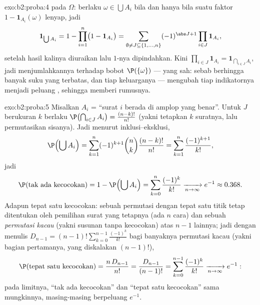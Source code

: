 \begin{solution}{exo:b2:proba:4}
 pada $\Omega$: berlaku $\omega \in \bigcup A_i$ bila dan hanya bila suatu faktor
$1 - \mathbf{1}_{A_i}(\omega)$ lenyap, jadi
\[
\mathbf{1}_{\bigcup A_i}
= 1 - \prod_{i=1}^n\bigl(1 - \mathbf{1}_{A_i}\bigr)
= \sum_{\emptyset \neq J \subseteq \{1,\dots,n\}}
(-1)^{\abs J + 1}\prod_{i \in J}\mathbf{1}_{A_i} ,
\]
setelah hasil kalinya diuraikan lalu $1$-nya dipindahkan. Kini
$\prod_{i\in J}\mathbf{1}_{A_i} = \mathbf{1}_{\bigcap_{i \in J}
A_i}$, jadi menjumlahkannya terhadap bobot $\P(\{\omega\})$ ---
yang sah: sebab berhingga banyak suku yang terbatas, dan tiap keluarganya  ---
mengubah tiap indikatornya menjadi peluang , sehingga memberi
rumusnya.
\end{solution}

\begin{solution}{exo:b2:proba:5}
Misalkan $A_i$ = ``surat $i$ berada di amplop yang benar''. Untuk $J$
berukuran $k$ berlaku $\P\bigl(\bigcap_{i\in J}A_i\bigr) =
\frac{(n-k)!}{n!}$ (yakni tetapkan $k$ suratnya, lalu permutasikan sisanya). Jadi menurut
inklusi--eksklusi,
\[
\P\Bigl(\bigcup A_i\Bigr)
= \sum_{k=1}^n (-1)^{k+1}\binom nk \frac{(n-k)!}{n!}
= \sum_{k=1}^n \frac{(-1)^{k+1}}{k!} ,
\]
jadi
\[
\P(\text{tak ada kecocokan})
= 1 - \P\Bigl(\bigcup A_i\Bigr)
= \sum_{k=0}^{n}\frac{(-1)^k}{k!}
\xrightarrow[n\to\infty]{} e^{-1} \approx 0.368 .
\]
Adapun tepat satu kecocokan: sebuah permutasi dengan tepat satu titik tetap
ditentukan oleh pemilihan surat yang tetapnya (ada $n$ cara) dan sebuah
\emph{permutasi kacau} (yakni susunan tanpa kecocokan) atas $n - 1$ lainnya;
jadi dengan menulis $D_{n-1} = (n-1)!\sum_{k=0}^{n-1}\frac{(-1)^k}{k!}$ bagi
banyaknya permutasi kacau (yakni bagian pertamanya, yang diskalakan
$(n-1)!$),
\[
\P(\text{tepat satu kecocokan})
= \frac{n\,D_{n-1}}{n!}
= \frac{D_{n-1}}{(n-1)!}
= \sum_{k=0}^{n-1}\frac{(-1)^k}{k!}
\xrightarrow[n\to\infty]{} e^{-1} :
\]
pada limitnya, ``tak ada kecocokan'' dan ``tepat satu kecocokan'' sama
mungkinnya, masing-masing berpeluang $e^{-1}$.
\end{solution}

